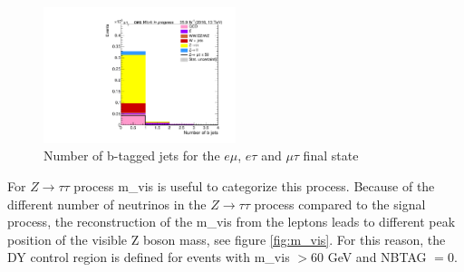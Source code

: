 \begin{figure}[htp]
	\includegraphics[width=0.5\textwidth]{plots/mt/NumberOfBJets.pdf}

	\caption[Number of b-tagged jets]{Number of b-tagged jets for the $e\mu$, $e\tau$ and $\mu\tau$ final state}
	\label{fig:NBTAG}
\end{figure}


For $Z\to\tau\tau$ process \gls{m_vis} is useful to categorize this process. Because of the different number of neutrinos in the $Z\to\tau\tau$ process compared to the signal process, the reconstruction of the \gls{m_vis} from the leptons leads to different peak position of the visible Z boson mass, see figure \ref{fig:m_vis}. For this reason, the \gls{DY} control region is defined for events with \gls{m_vis} $> 60$ GeV and \gls{NBTAG} $= 0$. \\

